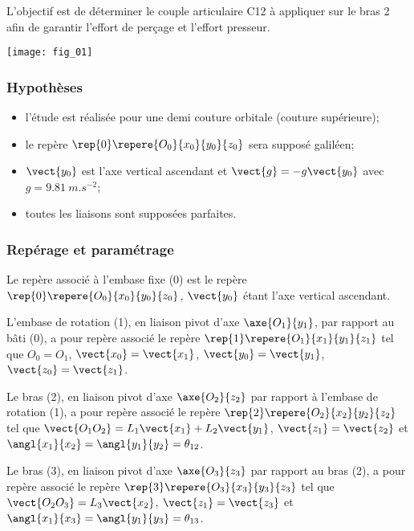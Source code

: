 \setcounter{exo}{0}

\begin{obj}
L'objectif est de déterminer le couple articulaire C12 à appliquer sur le bras 2 afin de garantir l'effort de
perçage et l’effort presseur.
\end{obj}


\begin{center}
\texttt{[image: fig\_01]}
\end{center}


\subsubsection*{Hypothèses}
\begin{itemize}
\item l'étude est réalisée pour une demi couture orbitale (couture supérieure);
\item le repère $\rep{0}\repere{O_0}{x_0}{y_0}{z_0}$ sera supposé galiléen;
\item $\vect{y_0}$ est l’axe vertical ascendant et $\vect{g}=-g\vect{y_0}$ avec $g = \SI{9,81}{m.s^{-2}}$;
\item toutes les liaisons sont supposées parfaites.
\end{itemize}



\subsubsection*{Repérage et paramétrage}
Le repère associé à l'embase fixe (0) est le repère $\rep{0}\repere{O_0}{x_0}{y_0}{z_0}$, $\vect{y_0}$ étant l'axe vertical
ascendant.

L'embase de rotation (1), en liaison pivot d'axe $\axe{O_1}{y_1}$, par rapport au bâti (0), a pour repère
associé le repère $\rep{1}\repere{O_1}{x_1}{y_1}{z_1}$ tel que $O_0=O_1$, $\vect{x_0}=\vect{x_1}$, $\vect{y_0}=\vect{y_1}$, $\vect{z_0}=\vect{z_1}$.

Le bras (2), en liaison pivot d'axe $\axe{O_2}{z_2}$ par rapport à l’embase de rotation (1), a pour repère
associé le repère $\rep{2}\repere{O_2}{x_2}{y_2}{z_2}$ tel que $\vect{O_1 O_2} = L_1\vect{x_1} + L_2\vect{y_1}$, $\vect{z_1}=\vect{z_2}$ et $\angl{x_1}{x_2}=\angl{y_1}{y_2}=\theta_{12}$.

Le bras (3), en liaison pivot d'axe $\axe{O_3}{z_3}$ par rapport au bras (2), a pour repère
associé le repère $\rep{3}\repere{O_3}{x_3}{y_3}{z_3}$ tel que $\vect{O_2 O_3} = L_3\vect{x_2} $, $\vect{z_1}=\vect{z_3}$ et $\angl{x_1}{x_3}=\angl{y_1}{y_3}=\theta_{13}$.


